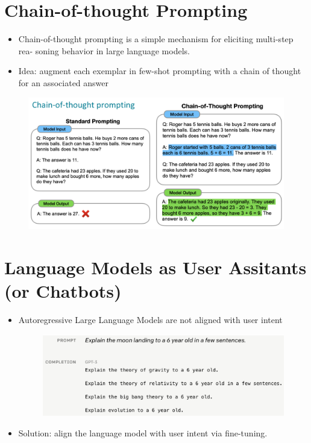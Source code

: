 \section{Chain-of-thought Prompting}
\begin{itemize}
\item Chain-of-thought prompting is a simple mechanism for eliciting multi-step rea-
soning behavior in large language models.
\item  Idea: augment each exemplar in few-shot prompting with a chain of thought for an associated answer \cite{wei2022chain}
\end{itemize}
 \begin{figure}[h]
        	\includegraphics[scale = 0.3]{pics/chainoftought.png}
        \end{figure}



\section{Language Models as User Assitants (or Chatbots)}

\begin{itemize}
\item Autoregressive Large Language Models are not aligned with user intent \cite{ouyang2022training}


 \begin{figure}[h]
        	\includegraphics[scale = 0.34]{pics/lmnotuserassistant.png}
        \end{figure}

\item Solution: align the language model with user intent via fine-tuning.


\end{itemize}




